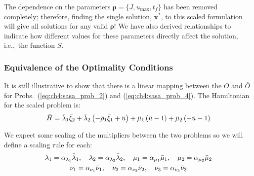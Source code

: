 \noindent The dependence on the parameters $\bm{\rho} = \{J, u_{\max}, t_f \}$ has been removed completely; therefore, finding the single solution, $\bar{\bm{x}}^*$, to this scaled formulation will give all solutions for any valid $\bm{\rho}$!
We have also derived relationships to indicate how different values for these parameters directly affect the solution, i.e.,~the function $S$. 

\subsubsection{Equivalence of the Optimality Conditions}

It is still illustrative to show that there is a linear mapping between the $O$ and $\bar{O}$ for Probs.~(\ref{eq:ch4:sasa_prob_2}) and (\ref{eq:ch4:sasa_prob_4}).
The Hamiltonian for the scaled problem is:
\begin{align}
\bar{H} = \bar{\lambda}_1 \bar{\xi}_2 + \bar{\lambda}_2 \left( -\bar{\rho}_1 \bar{\xi}_1 + \bar{u} \right) + \bar{\mu}_1 \left( \bar{u} - 1 \right) + \bar{\mu}_2 \left( -\bar{u} - 1 \right)
\end{align}

\noindent We expect some scaling of the multipliers between the two problems so we will define a scaling rule for each:
\begin{gather}
\begin{gathered}
\lambda_1 = \alpha_{\lambda_1} \bar{\lambda}_1, \quad \lambda_2 = \alpha_{\lambda_2} \bar{\lambda}_2, \quad \mu_1 = \alpha_{\mu_1} \bar{\mu}_1, \quad \mu_2 = \alpha_{\mu_2} \bar{\mu}_2 \\
\nu_1 = \alpha_{\nu_1} \bar{\nu}_1, \quad \nu_2 = \alpha_{\nu_2} \bar{\nu}_2, \quad \nu_3 = \alpha_{\nu_3} \bar{\nu}_3
\end{gathered}
\end{gather}

